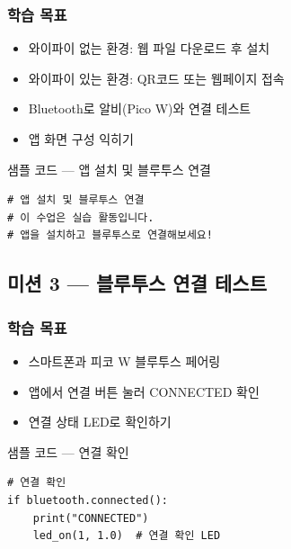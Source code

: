 \begin{storybox}
\end{storybox}

\subsubsection*{학습 목표}
\begin{itemize}[leftmargin=1.4em]
  \item 와이파이 없는 환경: 웹 파일 다운로드 후 설치
  \item 와이파이 있는 환경: QR코드 또는 웹페이지 접속
  \item Bluetooth로 알비(Pico W)와 연결 테스트
  \item 앱 화면 구성 익히기
\end{itemize}

\begin{labbox}{샘플 코드 --- 앱 설치 및 블루투스 연결}
\begin{verbatim}
# 앱 설치 및 블루투스 연결
# 이 수업은 실습 활동입니다.
# 앱을 설치하고 블루투스로 연결해보세요!
\end{verbatim}
\end{labbox}

\subsection{미션 3 --- 블루투스 연결 테스트}
\label{subsec:ch01-m3}

\begin{storybox}
\end{storybox}

\subsubsection*{학습 목표}
\begin{itemize}[leftmargin=1.4em]
  \item 스마트폰과 피코 W 블루투스 페어링
  \item 앱에서 연결 버튼 눌러 CONNECTED 확인
  \item 연결 상태 LED로 확인하기
\end{itemize}

\begin{labbox}{샘플 코드 --- 연결 확인}
\begin{verbatim}
# 연결 확인
if bluetooth.connected():
    print("CONNECTED")
    led_on(1, 1.0)  # 연결 확인 LED
\end{verbatim}
\end{labbox}

